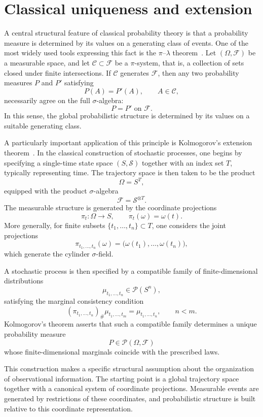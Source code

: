 \section{Classical uniqueness and extension}

A central structural feature of classical probability theory is that a probability measure is determined by its values on a generating class of events. One of the most widely used tools expressing this fact is the $\pi$--$\lambda$ theorem~\cite{Billingsley,Kallenberg}. Let $(\Omega,\mathcal F)$ be a measurable space, and let $\mathcal C \subset \mathcal F$ be a $\pi$-system, that is, a collection of sets closed under finite intersections. If $\mathcal C$ generates $\mathcal F$, then any two probability measures $P$ and $P'$ satisfying
\[
P(A) = P'(A), \qquad A \in \mathcal C,
\]
necessarily agree on the full $\sigma$-algebra:
\[
P = P' \text{ on } \mathcal F.
\]
In this sense, the global probabilistic structure is determined by its values on a suitable generating class.

A particularly important application of this principle is Kolmogorov's extension theorem~\cite{Kolmogorov,Billingsley}. In the classical construction of stochastic processes, one begins by specifying a single-time state space $(S,\mathcal S)$ together with an index set $T$, typically representing time. The trajectory space is then taken to be the product
\[
\Omega = S^T,
\]
equipped with the product $\sigma$-algebra
\[
\mathcal F = \mathcal S^{\otimes T}.
\]
The measurable structure is generated by the coordinate projections
\[
\pi_t : \Omega \to S, 
\qquad 
\pi_t(\omega) = \omega(t).
\]
More generally, for finite subsets $\{t_1,\dots,t_n\} \subset T$, one considers the joint projections
\[
\pi_{t_1,\dots,t_n}(\omega)
=
\big(\omega(t_1),\dots,\omega(t_n)\big),
\]
which generate the cylinder $\sigma$-field.

A stochastic process is then specified by a compatible family of finite-dimensional distributions
\[
\mu_{t_1,\dots,t_n}
\in
\mathcal P(S^n),
\]
satisfying the marginal consistency condition
\[
(\pi_{t_1,\dots,t_n})_\# \mu_{t_1,\dots,t_m}
=
\mu_{t_1,\dots,t_n},
\qquad
n < m.
\]
Kolmogorov's theorem asserts that such a compatible family determines a unique probability measure
\[
P \in \mathcal P(\Omega,\mathcal F)
\]
whose finite-dimensional marginals coincide with the prescribed laws.

This construction makes a specific structural assumption about the organization of observational information. The starting point is a global trajectory space together with a canonical system of coordinate projections. Measurable events are generated by restrictions of these coordinates, and probabilistic structure is built relative to this coordinate representation.

